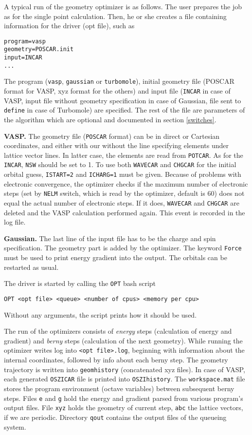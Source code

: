 \documentclass[12pt,a4]{article}
\begin{document}
A typical run of the geometry optimizer is as follows. The user prepares the job as for the single point calculation. Then, he or she creates a file containing information for the driver (opt file), such as
\begin{verbatim}
program=vasp
geometry=POSCAR.init
input=INCAR
...
\end{verbatim}
The program (\texttt{vasp}, \texttt{gaussian} or \texttt{turbomole}), initial geometry file (POSCAR format for VASP, xyz format for the others) and input file (\texttt{INCAR} in case of VASP, input file without geometry specification in case of Gaussian, file sent to \texttt{define} in case of Turbomole) are specified. The rest of the file are parameters of the algorithm which are optional and documented in section \ref{switches}. 

\textbf{VASP.} The geometry file (\texttt{POSCAR} format) can be in direct or Cartesian coordinates, and either with our without the line specifying elements under lattice vector lines. In latter case, the elements are read from \texttt{POTCAR}. As for the \texttt{INCAR}, \texttt{NSW} should be set to 1. To use both \texttt{WAVECAR} and \texttt{CHGCAR} for the initial orbital guess, \texttt{ISTART=2} and \texttt{ICHARG=1} must be given. Because of problems with electronic convergence, the optimizer checks if the maximum number of electronic steps (set by \texttt{NELM} switch, which is read by the optimizer, default is 60) does not equal the actual number of electronic steps. If it does, \texttt{WAVECAR} and \texttt{CHGCAR} are deleted and the VASP calculation performed again. This event is recorded in the log file.

\textbf{Gaussian.} The last line of the input file has to be the charge and spin specification. The geometry part is added by the optimizer. The keyword \texttt{Force} must be used to print energy gradient into the output. The orbitals can be restarted as usual.

The driver is started by calling the \texttt{OPT} bash script
\begin{verbatim}
OPT <opt file> <queue> <number of cpus> <memory per cpu>
\end{verbatim}
Without any arguments, the script prints how it should be used.

The run of the optimizers consists of \emph{energy} steps (calculation of energy and gradient) and \emph{berny} steps (calculation of the next geometry). While running the optimizer writes log into \texttt{<opt file>.log}, beginning with information about the internal coordinates, followed by info about each berny step. The geometry trajectory is written into \texttt{geomhistory} (concatenated xyz files). In case of VASP, each generated \texttt{OSZICAR} file is printed into \texttt{OSZIhistory}. The \texttt{workspace.mat} file stores the program environment (octave variables) between subsequent berny steps. Files \texttt{e} and \texttt{g} hold the energy and gradient parsed from various program's output files. File \texttt{xyz} holds the geometry of current step, \texttt{abc} the lattice vectors, if we are periodic. Directory \texttt{qout} contains the output files of the queueing system.
\end{document}

